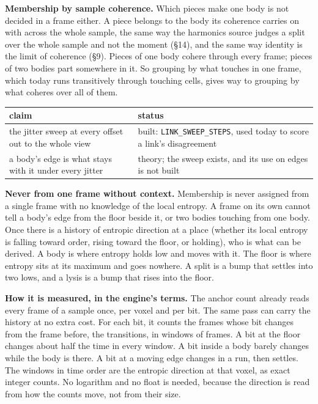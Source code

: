 \textbf{Membership by sample coherence.} Which pieces make one body is not decided in a frame either. A piece belongs to the body its coherence carries on with across the whole sample, the same way the harmonics source judges a split over the whole sample and not the moment (§14), and the same way identity is the limit of coherence (§9). Pieces of one body cohere through every frame; pieces of two bodies part somewhere in it. So grouping by what touches in one frame, which today runs transitively through touching cells, gives way to grouping by what coheres over all of them.

{\small
\setlength{\tabcolsep}{6pt}
\begin{longtable}{>{\RaggedRight\arraybackslash}p{}>{\RaggedRight\arraybackslash}p{}}
\toprule
claim & status \\
\midrule
\endhead
the jitter sweep at every offset out to the whole view & built: \texttt{LINK\_\allowbreak{}SWEEP\_\allowbreak{}STEPS}, used today to score a link's disagreement \\
a body's edge is what stays with it under every jitter & theory; the sweep exists, and its use on edges is not built \\
\bottomrule
\end{longtable}
}

\textbf{Never from one frame without context.} Membership is never assigned from a single frame with no knowledge of the local entropy. A frame on its own cannot tell a body's edge from the floor beside it, or two bodies touching from one body. Once there is a history of entropic direction at a place (whether its local entropy is falling toward order, rising toward the floor, or holding), who is what can be derived. A body is where entropy holds low and moves with it. The floor is where entropy sits at its maximum and goes nowhere. A split is a bump that settles into two lows, and a lysis is a bump that rises into the floor.

\textbf{How it is measured, in the engine's terms.} The anchor count already reads every frame of a sample once, per voxel and per bit. The same pass can carry the history at no extra cost. For each bit, it counts the frames whose bit changes from the frame before, the transitions, in windows of frames. A bit at the floor changes about half the time in every window. A bit inside a body barely changes while the body is there. A bit at a moving edge changes in a run, then settles. The windows in time order are the entropic direction at that voxel, as exact integer counts. No logarithm and no float is needed, because the direction is read from how the counts move, not from their size.

